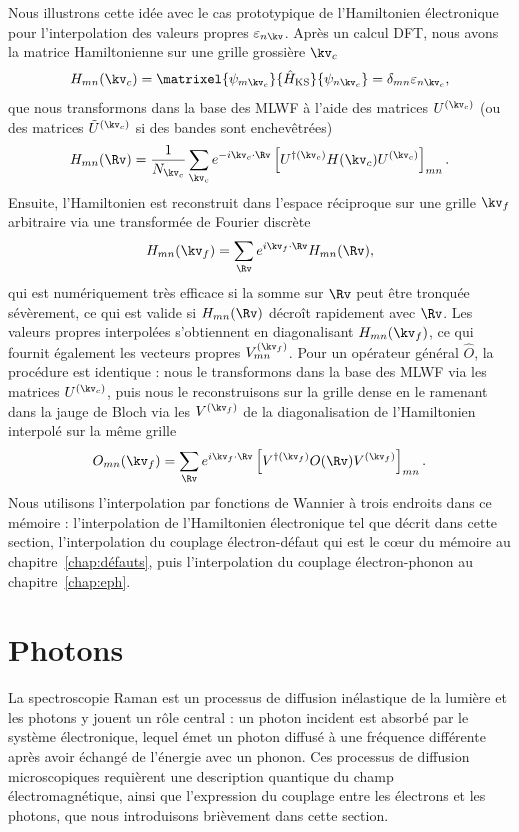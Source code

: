 Nous illustrons cette idée avec le cas prototypique de l'Hamiltonien électronique pour l'interpolation des valeurs propres $\varepsilon_{n\kv}$. Après un calcul DFT, nous avons la matrice Hamiltonienne sur une grille grossière $\kv_c$
\begin{equation}
    H_{mn}(\kv_c) = \matrixel{\psi_{m\kv_c}}{\hat{H}_\text{KS}}{\psi_{n\kv_c}}=\delta_{mn}\varepsilon_{n\kv_c},
\end{equation}
que nous transformons dans la base des MLWF à l'aide des matrices $U^{(\kv_c)}$ (ou des matrices $\tilde{U}^{(\kv_c)}$ si des bandes sont enchevêtrées)
\begin{equation}
    H_{mn}(\Rv) = \frac{1}{N_{\kv_c}}\sum_{\kv_c}e^{-i\kv_c\cdot\Rv}\left[U^{\dag(\kv_c)}H(\kv_c)U^{(\kv_c)}\right]_{mn}.
\end{equation}
Ensuite, l'Hamiltonien est reconstruit dans l'espace réciproque sur une grille $\kv_f$ arbitraire via une transformée de Fourier discrète 
\begin{equation}
    H_{mn}(\kv_f) = \sum_\Rv e^{i\kv_f\cdot\Rv}H_{mn}(\Rv),
\end{equation}
qui est numériquement très efficace si la somme sur $\Rv$ peut être tronquée sévèrement, ce qui est valide si $H_{mn}(\Rv)$ décroît rapidement avec $\Rv$. Les valeurs propres interpolées s'obtiennent en diagonalisant $H_{mn}(\kv_f)$, ce qui fournit également les vecteurs propres $V_{mn}^{(\kv_f)}$. Pour un opérateur général $\hat{O}$, la procédure est identique : nous le transformons dans la base des MLWF via les matrices $U^{(\kv_c)}$, puis nous le reconstruisons sur la grille dense en le ramenant dans la jauge de Bloch via les $V^{(\kv_f)}$ de la diagonalisation de l'Hamiltonien interpolé sur la même grille
\begin{equation}
    O_{mn}(\kv_f) = \sum_{\Rv}e^{i\kv_f\cdot\Rv}\left[V^{\dag(\kv_f)}O(\Rv)V^{(\kv_f)}\right]_{mn}.
\end{equation}
Nous utilisons l'interpolation par fonctions de Wannier à trois endroits dans ce mémoire : l'interpolation de l'Hamiltonien électronique tel que décrit dans cette section, l'interpolation du couplage électron-défaut qui est le c\oe ur du mémoire au chapitre~\ref{chap:défauts}, puis l'interpolation du couplage électron-phonon au chapitre~\ref{chap:eph}.

\section{Photons}\label{sec:photon}
La spectroscopie Raman est un processus de diffusion inélastique de la lumière et les photons y jouent un rôle central : un photon incident est absorbé par le système électronique, lequel émet un photon diffusé à une fréquence différente après avoir échangé de l'énergie avec un phonon. Ces processus de diffusion microscopiques requièrent une description quantique du champ électromagnétique, ainsi que l'expression du couplage entre les électrons et les photons, que nous introduisons brièvement dans cette section.

